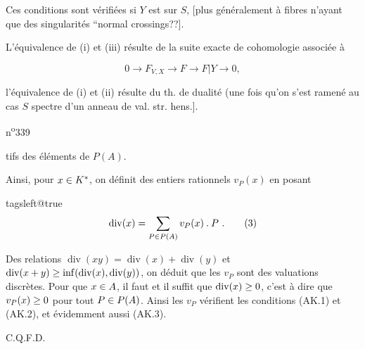 
Ces conditions sont vérifiées si
$Y$ est   sur $S$, [plus généralement
  à fibres n'ayant que des
singularités ``normal crossings??].

L'équivalence de (i) et (iii)
résulte de la suite exacte de cohomologie
associée à

\[ 0\longrightarrow F_{V,X}\longrightarrow F\longrightarrow F|Y\longrightarrow 0,\]

l'équivalence de (i) et (ii) résulte du
th. de dualité   (une fois
qu'on s'est ramené au cas $S$  spectre
d'un anneau de val.  str. hens.].



n\textsuperscript{o}339

tifs des éléments de $P(A)$.

Ainsi, pour $x\in K^{*}$, on définit des entiers rationnels $v_P(x)$ en posant

\begingroup\csname tagsleft@true\endcsname
\[ \operatorname{div}(x)=\handwritten{\sum}_{P\handwritten{\in}P(A)}v_P(x)\mathbin{.}P\ .\tag*{(3)} \]
\endgroup

Des relations $\operatorname{div}(xy)=\operatorname{div}(x)+\operatorname{div}(y)$ et $\operatorname{div}(x+y)\geq\inf(\operatorname{div}(x),\operatorname{div}(y))$, on déduit que les $v_P$ sont des valuations discrètes. Pour que $x\in A$, il faut et il suffit que $\operatorname{div}(x)\geq0$, c'est à dire que $v_P(x)\geq0$ pour tout $P\in P(A)$. Ainsi les $v_P$ vérifient les conditions (AK.1) et (AK.2), et évidemment aussi (AK.3).

C.Q.F.D.


